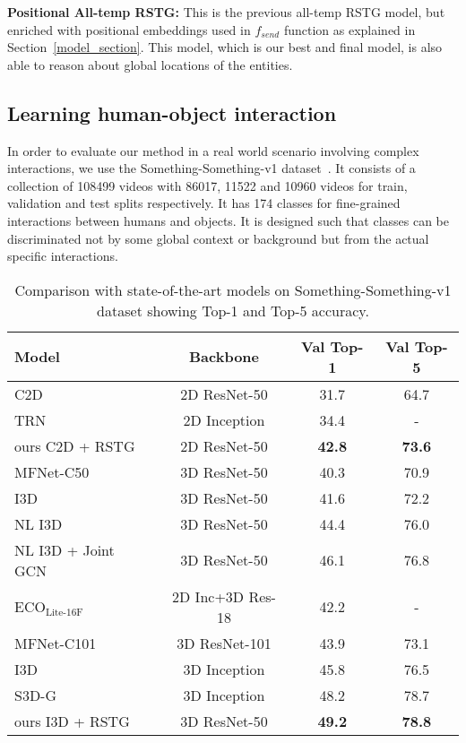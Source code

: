 \documentclass{article}
\begin{document}
\textbf{Positional All-temp RSTG:} This is the previous all-temp RSTG model, but enriched with positional embeddings used in $f_{send}$ function as explained in Section~\ref{model_section}. This model, which is our best and final model, is also  able to reason about global locations of the entities.

\subsection{Learning human-object interaction}
In order to evaluate our method in a real world scenario involving complex interactions, we use the Something-Something-v1 dataset~\cite{goyal2017something}.
It consists of a collection of 108499 videos with 86017, 11522 and 10960 videos for train, validation and test splits respectively.  It has 174 classes for fine-grained interactions between humans and objects. It is designed such that classes can be discriminated not by some global context or background but from the actual specific interactions. 


\begin{table}[t]
    \fontsize{9}{10}\selectfont
    \caption{Comparison with state-of-the-art models on Something-Something-v1 dataset showing Top-1 and Top-5 accuracy. }
\centering
           \begin{tabular}{lccc}
                \toprule
                Model & Backbone & Val Top-1  & Val Top-5 \\ \midrule
                \midrule
C2D    &  2D ResNet-50 & 31.7 & 64.7 \\ TRN \cite{zhou2018temporal_trn_torralba}& 2D Inception & 34.4 & - \\ ours C2D + RSTG    &  2D ResNet-50 & \textbf{42.8} & \textbf{73.6} \\ \midrule
                \midrule
MFNet-C50~\cite{Lee2018MF_Net} & 3D ResNet-50 & 40.3 & 70.9 \\

                I3D \cite{wang2018videos_gupta2}    & 3D ResNet-50 & 41.6 & 72.2  \\NL I3D \cite{wang2018videos_gupta2}    & 3D ResNet-50 & 44.4 & 76.0 \\

                NL I3D + Joint GCN \cite{wang2018videos_gupta2}    &  3D ResNet-50 & 46.1 & 76.8\\\midrule 
                $\text{ECO}_{\text{Lite-16F}}$~\cite{zolfaghari2018eco} & 2D Inc+3D Res-18  & 42.2 & - \\MFNet-C101~\cite{Lee2018MF_Net} & 3D ResNet-101 & 43.9 & 73.1 \\I3D \cite{xie2018rethinking} & 3D Inception & 45.8 & 76.5  \\

                S3D-G~\cite{xie2018rethinking} & 3D Inception & 48.2 & 78.7  \\\midrule
                ours I3D + RSTG & 3D ResNet-50  & \textbf{49.2} & \textbf{78.8} \\\bottomrule
            \end{tabular}
            \label{tab:results}
            \end{table}
\end{document}
